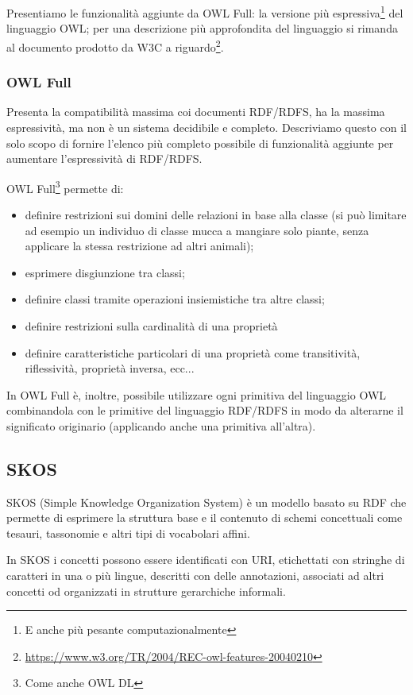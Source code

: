 Presentiamo le funzionalità aggiunte da OWL Full: la versione più espressiva\footnote{E anche più pesante computazionalmente} del linguaggio OWL; per una descrizione più approfondita del linguaggio si rimanda al documento prodotto da W3C a riguardo\footnote{\url{https://www.w3.org/TR/2004/REC-owl-features-20040210}}.
\subsubsection{OWL Full}
Presenta la compatibilità massima coi documenti RDF/RDFS, ha la massima espressività, ma non è un sistema decidibile e completo. Descriviamo questo con il solo scopo di fornire l'elenco più completo possibile di funzionalità aggiunte per aumentare l'espressività di RDF/RDFS.

OWL Full\footnote{Come anche OWL DL} permette di:
\begin{itemize}
	\item definire restrizioni sui domini delle relazioni in base alla classe (si può limitare ad esempio un individuo di classe mucca a mangiare solo piante, senza applicare la stessa restrizione ad altri animali);
	\item esprimere disgiunzione tra classi;
	\item definire classi tramite operazioni insiemistiche tra altre classi;
	\item definire restrizioni sulla cardinalità di una proprietà
	\item definire caratteristiche particolari di una proprietà come transitività, riflessività, proprietà inversa, ecc...
\end{itemize}

In OWL Full è, inoltre, possibile utilizzare ogni primitiva del linguaggio OWL combinandola con le primitive del linguaggio RDF/RDFS in modo da alterarne il significato originario (applicando anche una primitiva all'altra).
\subsection{SKOS}
SKOS (Simple Knowledge Organization System) è un modello basato su RDF che permette di esprimere la struttura base e il contenuto di schemi concettuali come tesauri, tassonomie e altri tipi di vocabolari affini\cite{isaac2009skos}.

In SKOS i concetti possono essere identificati con URI, etichettati con stringhe di caratteri in una o più lingue, descritti con delle annotazioni, associati ad altri concetti od organizzati in strutture gerarchiche informali\cite{miles2009skos}.

